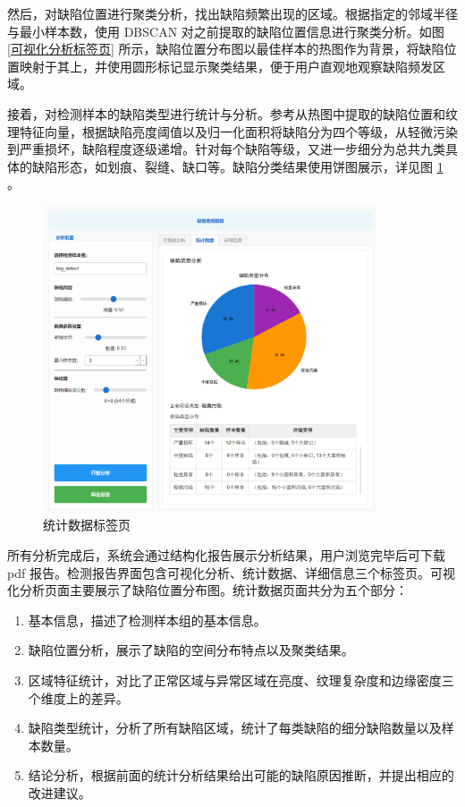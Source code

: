\documentclass[
  ]{njuthesis}
\begin{document}
然后，对缺陷位置进行聚类分析，找出缺陷频繁出现的区域。根据指定的邻域半径与最小样本数，使用 DBSCAN 对之前提取的缺陷位置信息进行聚类分析。如图 \ref{可视化分析标签页} 所示，缺陷位置分布图以最佳样本的热图作为背景，将缺陷位置映射于其上，并使用圆形标记显示聚类结果，便于用户直观地观察缺陷频发区域。

接着，对检测样本的缺陷类型进行统计与分析。参考从热图中提取的缺陷位置和纹理特征向量，根据缺陷亮度阈值以及归一化面积将缺陷分为四个等级，从轻微污染到严重损坏，缺陷程度逐级递增。针对每个缺陷等级，又进一步细分为总共九类具体的缺陷形态，如划痕、裂缝、缺口等。缺陷分类结果使用饼图展示，详见图 \ref{统计数据标签页} 。

\begin{figure}[H]
    \centering
    \includegraphics[width=0.88\textwidth]{images/统计数据标签页.png}
    \caption{统计数据标签页}
    \label{统计数据标签页}
\end{figure}

所有分析完成后，系统会通过结构化报告展示分析结果，用户浏览完毕后可下载 pdf 报告。检测报告界面包含可视化分析、统计数据、详细信息三个标签页。可视化分析页面主要展示了缺陷位置分布图。统计数据页面共分为五个部分：

\begin{enumerate}
    \item 基本信息，描述了检测样本组的基本信息。
    \item 缺陷位置分析，展示了缺陷的空间分布特点以及聚类结果。
    \item 区域特征统计，对比了正常区域与异常区域在亮度、纹理复杂度和边缘密度三个维度上的差异。
    \item 缺陷类型统计，分析了所有缺陷区域，统计了每类缺陷的细分缺陷数量以及样本数量。
    \item 结论分析，根据前面的统计分析结果给出可能的缺陷原因推断，并提出相应的改进建议。
\end{enumerate}
\end{document}
